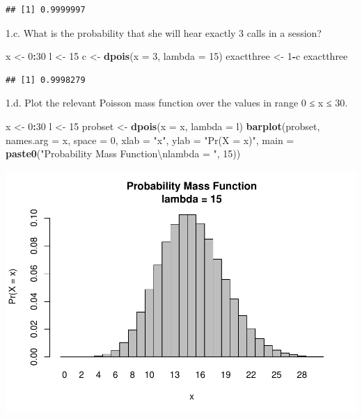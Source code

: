 \documentclass[]{article}
\newenvironment{Shaded}{\begin{snugshade}}{\end{snugshade}}
\newcommand{\KeywordTok}[1]{\textcolor[rgb]{0.13,0.29,0.53}{\textbf{#1}}}
\newcommand{\DataTypeTok}[1]{\textcolor[rgb]{0.13,0.29,0.53}{#1}}
\newcommand{\DecValTok}[1]{\textcolor[rgb]{0.00,0.00,0.81}{#1}}
\newcommand{\CharTok}[1]{\textcolor[rgb]{0.31,0.60,0.02}{#1}}
\newcommand{\StringTok}[1]{\textcolor[rgb]{0.31,0.60,0.02}{#1}}
\newcommand{\OperatorTok}[1]{\textcolor[rgb]{0.81,0.36,0.00}{\textbf{#1}}}
\newcommand{\NormalTok}[1]{#1}
\begin{document}
\begin{verbatim}
## [1] 0.9999997
\end{verbatim}

1.c. What is the probability that she will hear exactly 3 calls in a
session?

\begin{Shaded}
\begin{Highlighting}[]
\NormalTok{x <-}\StringTok{ }\DecValTok{0}\OperatorTok{:}\DecValTok{30}
\NormalTok{l <-}\StringTok{ }\DecValTok{15}
\NormalTok{c <-}\StringTok{ }\KeywordTok{dpois}\NormalTok{(}\DataTypeTok{x =} \DecValTok{3}\NormalTok{, }\DataTypeTok{lambda =} \DecValTok{15}\NormalTok{)}
\NormalTok{exactthree <-}\StringTok{ }\DecValTok{1}\OperatorTok{-}\NormalTok{c}
\NormalTok{exactthree}
\end{Highlighting}
\end{Shaded}

\begin{verbatim}
## [1] 0.9998279
\end{verbatim}

1.d. Plot the relevant Poisson mass function over the values in range 0
≤ x ≤ 30.

\begin{Shaded}
\begin{Highlighting}[]
\NormalTok{x <-}\StringTok{ }\DecValTok{0}\OperatorTok{:}\DecValTok{30}
\NormalTok{l <-}\StringTok{ }\DecValTok{15}
\NormalTok{probset <-}\StringTok{ }\KeywordTok{dpois}\NormalTok{(}\DataTypeTok{x =}\NormalTok{ x, }\DataTypeTok{lambda =}\NormalTok{ l)}
\KeywordTok{barplot}\NormalTok{(probset, }\DataTypeTok{names.arg =}\NormalTok{ x, }\DataTypeTok{space =} \DecValTok{0}\NormalTok{, }\DataTypeTok{xlab =} \StringTok{"x"}\NormalTok{, }\DataTypeTok{ylab =} \StringTok{"Pr(X = x)"}\NormalTok{, }\DataTypeTok{main =} \KeywordTok{paste0}\NormalTok{(}\StringTok{"Probability Mass Function}\CharTok{\textbackslash{}n}\StringTok{lambda = "}\NormalTok{, }\DecValTok{15}\NormalTok{))}
\end{Highlighting}
\end{Shaded}

\includegraphics{Locker-Angelina-ADA-Homework-02_files/figure-latex/unnamed-chunk-5-1.pdf}
\end{document}

